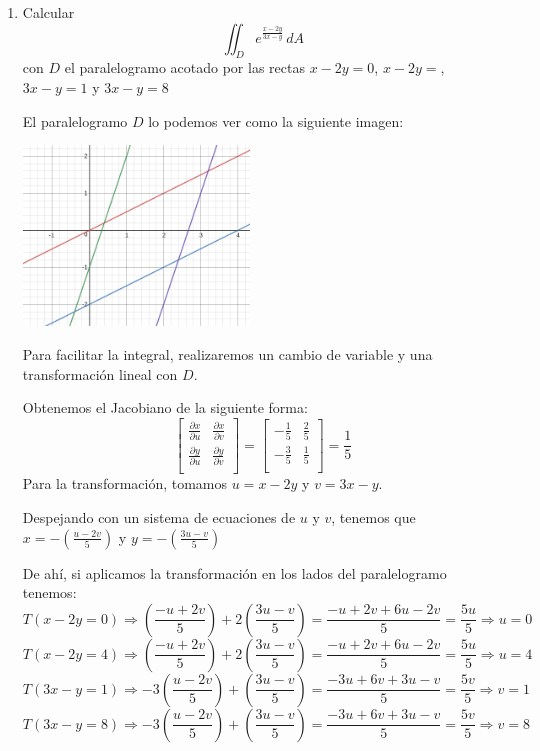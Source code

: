 \documentclass{article}
\begin{document}
\begin{enumerate}
        \pagebreak
        \item {
            Calcular
            \[
                \iint_{D}{e^{\frac{x-2y}{3x-y}}\,dA}
            \]
            con $D$ el paralelogramo acotado por las rectas $x-2y=0$, $x-2y=$,
            $3x-y=1$ y $3x-y=8$

            \color{azul}
            El paralelogramo $D$ lo podemos ver como la siguiente imagen:
            \begin{center}
                \includegraphics[width=6cm]{img/ejercicio2.png}
         	\end{center}
             Para facilitar la integral, realizaremos un cambio de variable
             y una transformación lineal con $D$.

             Obtenemos el Jacobiano de la siguiente forma:
             \[
                 \begin{bmatrix}
                     \frac{\partial x}{\partial u}&
                     \frac{\partial x}{\partial v}\\
                     \frac{\partial y}{\partial u}&
                     \frac{\partial y}{\partial v}\\
                 \end{bmatrix}
                 =
                 \begin{bmatrix}
                     -\frac{1}{5}
                     &\frac{2}{5}\\
                     -\frac{3}{5}
                     &\frac{1}{5}\\
                 \end{bmatrix}
                 =\frac{1}{5}
             \]
             Para la transformación, tomamos $u = x-2y$ y $v= 3x-y$.
            
             Despejando con un sistema de ecuaciones de $u$ y $v$, tenemos que
             $x = -(\frac{u-2v}{5})$ y  $y = -(\frac{3u-v}{5})$

             De ahí, si aplicamos la transformación en los lados del
             paralelogramo tenemos:
             $$T(x-2y=0) \Rightarrow (\frac{-u+2v}{5}) + 2(\frac{3u-v}{5}) =
             \frac{-u+2v+6u-2v}{5} = \frac{5u}{5} \Rightarrow u = 0$$
             $$T(x-2y=4) \Rightarrow (\frac{-u+2v}{5}) + 2(\frac{3u-v}{5}) =
             \frac{-u+2v+6u-2v}{5} = \frac{5u}{5} \Rightarrow u = 4$$
             $$T(3x-y=1) \Rightarrow -3(\frac{u-2v}{5}) + (\frac{3u-v}{5}) =
             \frac{-3u+6v+3u-v}{5} = \frac{5v}{5} \Rightarrow v = 1$$
             $$T(3x-y=8) \Rightarrow -3(\frac{u-2v}{5}) + (\frac{3u-v}{5}) =
             \frac{-3u+6v+3u-v}{5} = \frac{5v}{5} \Rightarrow v = 8$$

}
\end{enumerate}
\end{document}
